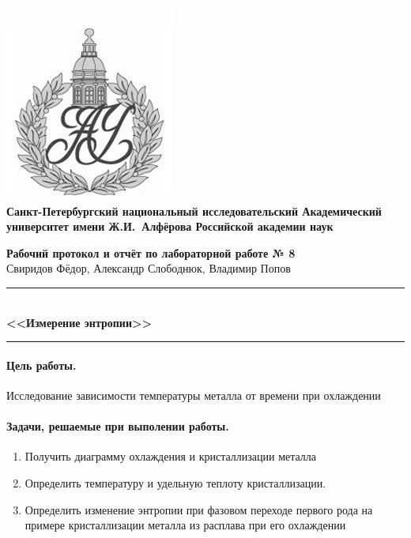\documentclass[a4paper]{article}
\begin{document}
\begin{center}
	\includegraphics[scale=0.25]{AU}\\
	{\Large\bfseries Санкт-Петербургский национальный исследовательский Академический университет имени Ж.И.~Алфёрова Российской академии наук}
\end{center}

\begin{center}
	{\large\textbf{Рабочий протокол и отчёт по лабораторной работе № 8}}\\
	Свиридов Фёдор, Александр Слободнюк, Владимир Попов
\end{center}

\begin{center}
	\rule{12cm}{0.4mm}\\
	\large\bfseries{<<Измерение энтропии>>}\\
	\rule{12cm}{0.4mm}
\end{center}
\paragraph{Цель работы.} Исследование зависимости температуры металла от времени при охлаждении
\paragraph{Задачи, решаемые при выполении работы.}
\begin{enumerate}
	\item Получить диаграмму охлаждения и кристаллизации металла
	\item Определить температуру и удельную теплоту кристаллизации.
	\item Определить изменение энтропии при фазовом переходе первого рода на примере кристаллизации металла из расплава при его охлаждении
\end{enumerate}
\end{document}

